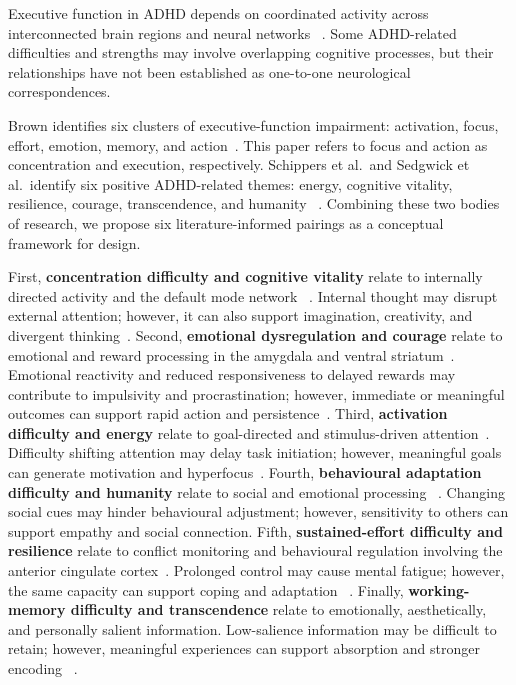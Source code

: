 \documentclass[manuscript,screen,review,anonymous]{acmart}
\begin{document}
Executive function in ADHD depends on coordinated activity across
interconnected brain regions and neural networks
~\cite{castellanos2002,durston2004,nakao2011,valera2007}. Some ADHD-related
difficulties and strengths may involve overlapping cognitive processes, but
their relationships have not been established as one-to-one neurological
correspondences.

Brown identifies six clusters of executive-function impairment: activation,
focus, effort, emotion, memory, and action~\cite{brown2008}. This paper refers
to focus and action as concentration and execution, respectively. Schippers
et al.\ and Sedgwick et al.\ identify six positive ADHD-related themes:
energy, cognitive vitality, resilience, courage, transcendence, and humanity
~\cite{schippers2022,sedgwick2019}. Combining these two bodies of research, we
propose six literature-informed pairings as a conceptual framework for design.

First, \textbf{concentration difficulty and cognitive vitality} relate to
internally directed activity and the default mode network
~\cite{ammaniti2013,stinemorrow2008,sestieri2011}. Internal thought may disrupt
external attention; however, it can also support imagination, creativity, and
divergent thinking~\cite{mole2022}. Second, \textbf{emotional dysregulation
and courage} relate to emotional and reward processing in the amygdala and
ventral striatum~\cite{williams2008,plessen2006,plichta2014}. Emotional
reactivity and reduced responsiveness to delayed rewards may contribute to
impulsivity and procrastination; however, immediate or meaningful outcomes
can support rapid action and persistence~\cite{du2006,knutson2001}. Third,
\textbf{activation difficulty and energy} relate to goal-directed and
stimulus-driven attention~\cite{corbetta2002}. Difficulty shifting attention
may delay task initiation; however, meaningful goals can generate motivation
and hyperfocus~\cite{schippers2022}. Fourth, \textbf{behavioural adaptation
difficulty and humanity} relate to social and emotional processing
~\cite{humphrey1976,salovey1990}. Changing social cues may hinder behavioural
adjustment; however, sensitivity to others can support empathy and social
connection. Fifth, \textbf{sustained-effort difficulty and resilience} relate
to conflict monitoring and behavioural regulation involving the anterior
cingulate cortex~\cite{garmezy1971,carter2007}. Prolonged control may cause
mental fatigue; however, the same capacity can support coping and adaptation
~\cite{baumeister2000}. Finally, \textbf{working-memory difficulty and
transcendence} relate to emotionally, aesthetically, and personally salient
information. Low-salience information may be difficult to retain; however,
meaningful experiences can support absorption and stronger encoding
~\cite{martinez2016,shiota2006}.
\end{document}
